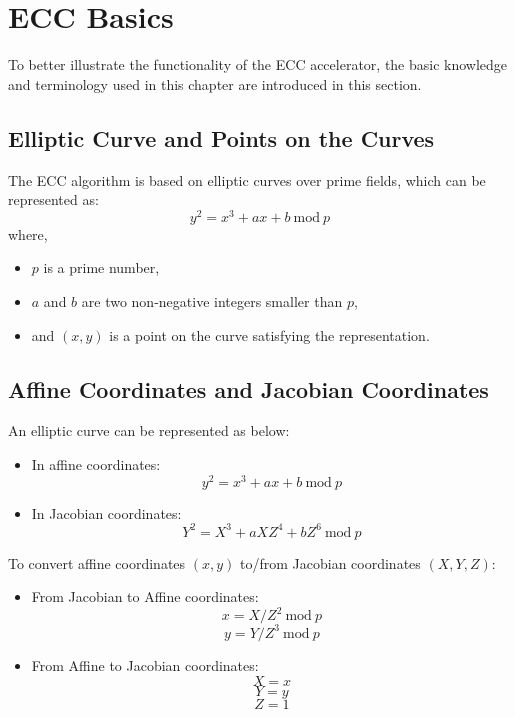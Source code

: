 \documentclass[main\_\_EN.tex]{subfiles}
\begin{document}
\section{ECC Basics}

To better illustrate the functionality of the ECC accelerator, the basic knowledge and terminology used in this chapter are introduced in this section.

\subsection{Elliptic Curve and Points on the Curves}

The ECC algorithm is based on elliptic curves over prime fields, which can be represented as:
\[
{y}^{2} = {x}^{3} + {ax} + b \ \textrm{mod}\ p
\]
where,
\begin{itemize}
    \item $p$ is a prime number,
    \item $a$ and $b$ are two non-negative integers smaller than $p$,
    \item and $(x, y)$ is a point on the curve satisfying the representation.
\end{itemize}


\subsection{Affine Coordinates and Jacobian Coordinates}

An elliptic curve can be represented as below:

\begin{itemize}
    \item In affine coordinates:
    \[
    {y}^{2} = {x}^{3} + {ax} + b \ \textrm{mod}\ p
    \]
    \item In Jacobian coordinates:
    \[
    {Y}^{2} = {X}^{3} + {aXZ}^{4} + {bZ}^{6} \ \textrm{mod}\ p
    \]
\end{itemize}

To convert affine coordinates $(x,y)$ to/from Jacobian coordinates $(X,Y,Z)$:

\begin{itemize}
    \item From Jacobian to Affine coordinates:
    \[
    x = X / {Z}^2 \ \textrm{mod}\ p
    \]
    \[
    y = Y / {Z}^3 \ \textrm{mod}\ p
    \]
    \item From Affine to Jacobian coordinates:
    \[ X = x \]
    \[ Y = y \]
    \[ Z = 1\]
\end{itemize}
\end{document}
